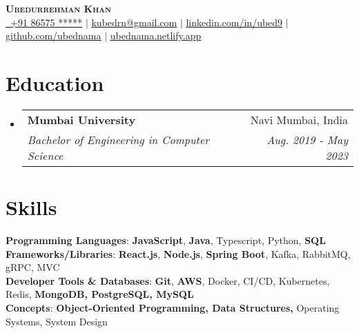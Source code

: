 \documentclass[a4paper,11pt]{article}
\makeatletter
\newcommand{\resumeSubheading}[4]{
  \vspace{-2pt}\item
    \begin{tabular*}{0.97\textwidth}[t]{l@{\extracolsep{\fill}}r}
      \textbf{#1} & #2 \\
      \textit{\small#3} & \textit{\small #4} \\
    \end{tabular*}\vspace{-7pt}
}
\makeatother
\begin{document}
\begin{center}
    \textbf{\Huge \scshape Ubedurrehman Khan} \\ \vspace{1pt}
    \small \href{tel:+9186575}{ \ +91 86575 *****} $|$ \href{mailto:kubedrn@gmail.com}{\underline{kubedrn@gmail.com}} $|$ 
    \href{https://linkedin.com/in/ubed9}{\underline{linkedin.com/in/ubed9}} $|$
    \href{https://github.com/ubednama}{\underline{github.com/ubednama}} $|$
    \href{https://ubednama.netlify.app/}{\underline{ubednama.netlify.app}}\\[4pt]
\end{center}


\section{Education}
\begin{itemize}[leftmargin=0.15in, label={}]
    \resumeSubheading
        {Mumbai University}{Navi Mumbai, India}
        {Bachelor of Engineering in Computer Science}{Aug. 2019 - May 2023}
\end{itemize}

\noindent\section*{Skills}
 \begin{itemize}[leftmargin=0.15in, label={}]
    \small{\item{
     \textbf{Programming Languages}{: \textbf{JavaScript}, \textbf{Java}, Typescript, Python, \textbf{SQL}} \\
     \textbf{Frameworks/Libraries}{: \textbf{React.js}, \textbf{Node.js}, \textbf{Spring Boot}, Kafka, RabbitMQ, gRPC, MVC} \\
     \textbf{Developer Tools \& Databases}{: \textbf{Git}, \textbf{AWS}, Docker, CI/CD, Kubernetes, Redis, \textbf{MongoDB, PostgreSQL, MySQL}}\\
     \textbf{Concepts}{: \textbf{Object-Oriented Programming, Data Structures,} Operating Systems, System Design}
    }}
 \end{itemize}

\end{document}

